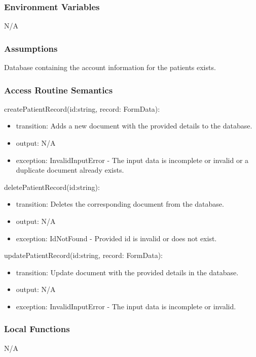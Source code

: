 \documentclass[12pt, titlepage]{article}
\begin{document}
\subsubsection{Environment Variables}
N/A

\subsubsection{Assumptions}
Database containing the account information for the patients exists.

\subsubsection{Access Routine Semantics}

\noindent createPatientRecord(id:string, record: FormData):
\begin{itemize}
\item transition: Adds a new document with the provided details to the database.
\item output: N/A
\item exception: InvalidInputError - The input data is incomplete or invalid or a duplicate document already exists.
\end{itemize}

\noindent deletePatientRecord(id:string):
\begin{itemize}
\item transition: Deletes the corresponding document from the database.
\item output: N/A
\item exception: IdNotFound - Provided id is invalid or does not exist.
\end{itemize}

\noindent updatePatientRecord(id:string, record: FormData):
\begin{itemize}
\item transition: Update document with the provided details in the database.
\item output: N/A
\item exception: InvalidInputError - The input data is incomplete or invalid.
\end{itemize}

\subsubsection{Local Functions}

N/A

\newpage
\end{document}
